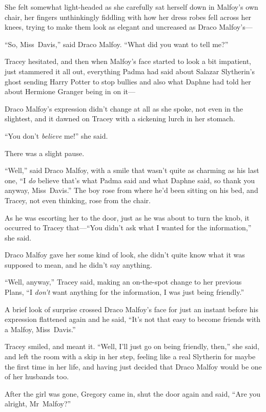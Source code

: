 She felt somewhat light-headed as she carefully sat herself down in Malfoy’s own chair, her fingers unthinkingly fiddling with how her dress robes fell across her knees, trying to make them look as elegant and uncreased as Draco Malfoy’s—

“So, Miss~Davis,” said Draco Malfoy. “What did you want to tell me?”

Tracey hesitated, and then when Malfoy’s face started to look a bit impatient, just stammered it all out, everything Padma had said about Salazar Slytherin’s ghost sending Harry Potter to stop bullies and also what Daphne had told her about Hermione Granger being in on it—

Draco Malfoy’s expression didn’t change at all as she spoke, not even in the slightest, and it dawned on Tracey with a sickening lurch in her stomach.

“You don’t \emph{believe} me!” she said.

There was a slight pause.

“Well,” said Draco Malfoy, with a smile that wasn’t quite as charming as his last one, “I \emph{do} believe that’s what Padma said and what Daphne said, so thank you anyway, Miss~Davis.” The boy rose from where he’d been sitting on his bed, and Tracey, not even thinking, rose from the chair.

As he was escorting her to the door, just as he was about to turn the knob, it occurred to Tracey that—“You didn’t ask what I wanted for the information,” she said.

Draco Malfoy gave her some kind of look, she didn’t quite know what it was supposed to mean, and he didn’t say anything.

“Well, anyway,” Tracey said, making an on-the-spot change to her previous Plans, “I \emph{don’t} want anything for the information, I was just being friendly.”

A brief look of surprise crossed Draco Malfoy’s face for just an instant before his expression flattened again and he said, “It’s not that easy to become friends with a Malfoy, Miss~Davis.”

Tracey smiled, and meant it. “Well, I’ll just go on being friendly, then,” she said, and left the room with a skip in her step, feeling like a real Slytherin for maybe the first time in her life, and having just decided that Draco Malfoy would be one of her husbands too.

\later

After the girl was gone, Gregory came in, shut the door again and said, “Are you alright, Mr~Malfoy?”

